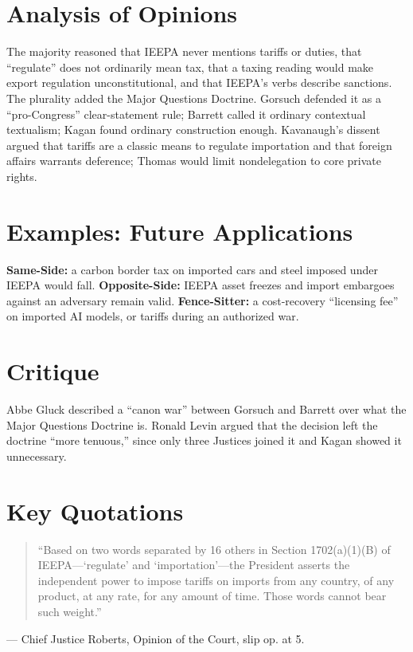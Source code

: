 \documentclass[12pt]{article}
\begin{document}
\section{Analysis of Opinions}
The majority reasoned that IEEPA never mentions tariffs or duties, that ``regulate'' does not ordinarily mean tax, that a taxing reading would make export regulation unconstitutional, and that IEEPA's verbs describe sanctions. The plurality added the Major Questions Doctrine. Gorsuch defended it as a ``pro-Congress'' clear-statement rule; Barrett called it ordinary contextual textualism; Kagan found ordinary construction enough. Kavanaugh's dissent argued that tariffs are a classic means to regulate importation and that foreign affairs warrants deference; Thomas would limit nondelegation to core private rights.

\section{Examples: Future Applications}
\textbf{Same-Side:} a carbon border tax on imported cars and steel imposed under IEEPA would fall. \textbf{Opposite-Side:} IEEPA asset freezes and import embargoes against an adversary remain valid. \textbf{Fence-Sitter:} a cost-recovery ``licensing fee'' on imported AI models, or tariffs during an authorized war.

\section{Critique}
Abbe Gluck described a ``canon war'' between Gorsuch and Barrett over what the Major Questions Doctrine is. Ronald Levin argued that the decision left the doctrine ``more tenuous,'' since only three Justices joined it and Kagan showed it unnecessary.

\section{Key Quotations}
\begin{quote}
``Based on two words separated by 16 others in Section 1702(a)(1)(B) of IEEPA---`regulate' and `importation'---the President asserts the independent power to impose tariffs on imports from any country, of any product, at any rate, for any amount of time. Those words cannot bear such weight.''
\end{quote}
\noindent --- Chief Justice Roberts, Opinion of the Court, slip op. at 5.
\end{document}
